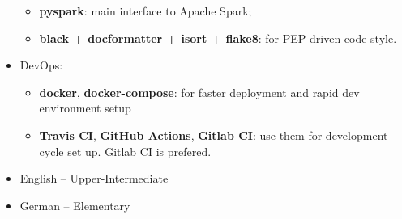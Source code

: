 \begin{itemize}
\begin{itemize}
            \item \textbf{pyspark}: main interface to Apache Spark;
            \item \textbf{black + docformatter + isort + flake8}: for PEP-driven code style.
        \end{itemize}
    \item DevOps: 
        \begin{itemize}
            \item \textbf{docker}, \textbf{docker-compose}: for faster deployment and rapid dev environment setup
            \item \textbf{Travis CI}, \textbf{GitHub Actions}, \textbf{Gitlab CI}: use them for development cycle set up. Gitlab CI is prefered.
        \end{itemize}
\end{itemize}








\begin{itemize}
	\item English -- Upper-Intermediate
    \item German -- Elementary
\end{itemize}

